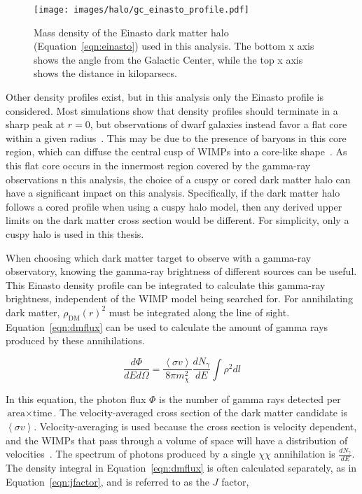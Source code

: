     \begin{figure}[ht]
      \centering
      \texttt{[image: images/halo/gc\_einasto\_profile.pdf]}
      \caption[Galactic Center Einasto Halo Density]{
        Mass density of the Einasto dark matter halo (Equation~\ref{eqn:einasto}) used in this analysis.
        The bottom x axis shows the angle from the Galactic Center, while the top x axis shows the distance in kiloparsecs.
        \CaptionBlankLine
        }
      \label{fig:gchalo_density}
    \end{figure}

    Other density profiles exist, but in this analysis only the Einasto profile is considered.
    Most simulations show that density profiles should terminate in a sharp peak at $r=0$, but observations of dwarf galaxies instead favor a flat core within a given radius~\cite{flores1994observational,CoreVsCusp}.
    This may be due to the presence of baryons in this core region, which can diffuse the central cusp of WIMPs into a core-like shape~\cite{corecusp_baryondiffuse1,corecusp_baryondiffuse2}.
    As this flat core occurs in the innermost region covered by the gamma-ray observations n this analysis, the choice of a cuspy or cored dark matter halo can have a significant impact on this analysis.
    Specifically, if the dark matter halo follows a cored profile when using a cuspy halo model, then any derived upper limits on the dark matter cross section would be different.
    For simplicity, only a cuspy halo is used in this thesis.
    
    When choosing which dark matter target to observe with a gamma-ray observatory, knowing the gamma-ray brightness of different sources can be useful.
    This Einasto density profile can be integrated to calculate this gamma-ray brightness, independent of the WIMP model being searched for.
    For annihilating dark matter, $\rho_{\textrm{DM}}\left(r\right)^2$ must be integrated along the line of sight.
    Equation~\ref{eqn:dmflux} can be used to calculate the amount of gamma rays produced by these annihilations.
    
    \begin{equation}\label{eqn:dmflux}
      \frac{ d\Phi }{ dE d \Omega } = \frac{ \left \langle \sigma v \right \rangle }{8 \pi m_\chi^2} \frac{dN_{\gamma}}{dE} \int \rho^2 dl
    \end{equation}
    
    In this equation, the photon flux $\Phi$ is the number of gamma rays detected per $\textrm{area}\times\textrm{time}$.
    The velocity-averaged cross section of the dark matter candidate is $\left \langle \sigma v \right \rangle$.
    Velocity-averaging is used because the cross section is velocity dependent, and the WIMPs that pass through a volume of space will have a distribution of velocities~\cite{wimp_veldist}.
    The spectrum of photons produced by a single $\chi\chi$ annihilation is $\frac{dN_{\gamma}}{dE}$.
    The density integral in Equation~\ref{eqn:dmflux} is often calculated separately, as in Equation~\ref{eqn:jfactor}, and is referred to as the $J$ factor,

